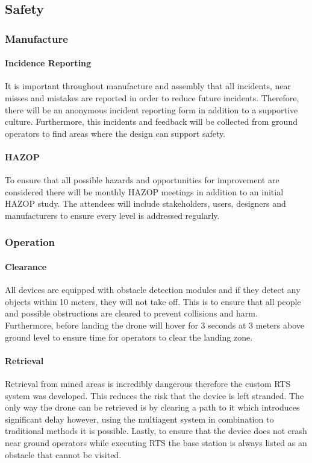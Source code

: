 \subsection{Safety}\label{sub_section:tgt_safety}
\subsubsection{Manufacture}\label{sub_sub_section:tgt_safety_manufacture}
\paragraph{Incidence Reporting}
It is important throughout manufacture and assembly that all incidents, near misses and mistakes are reported in order to reduce future incidents. Therefore, there will be an anonymous incident reporting form in addition to a supportive culture. Furthermore, this incidents and feedback will be collected from ground operators to find areas where the design can support safety.
\paragraph{\gls{HAZOP}}
To ensure that all possible hazards and opportunities for improvement are considered there will be monthly \gls{HAZOP} meetings in addition to an initial \gls{HAZOP} study. The attendees will include stakeholders, users, designers and manufacturers to ensure every level is addressed regularly.

\subsubsection{Operation}\label{sub_sub_section:tgt_safety_operation}
\paragraph{Clearance}
All devices are equipped with obstacle detection modules and if they detect any objects within 10 meters, they will not take off. This is to ensure that all people and possible obstructions are cleared to prevent collisions and harm. Furthermore, before landing the drone will hover for 3 seconds at 3 meters above ground level to ensure time for operators to clear the landing zone.
\paragraph{Retrieval}
Retrieval from mined areas is incredibly dangerous therefore the custom \gls{RTS} system was developed. This reduces the risk that the device is left stranded. The only way the drone can be retrieved is by clearing a path to it which introduces significant delay however, using the multiagent system in combination to traditional methods it is possible. Lastly, to ensure that the device does not crash near ground operators while executing \gls{RTS} the base station is always listed as an obstacle that cannot be visited.